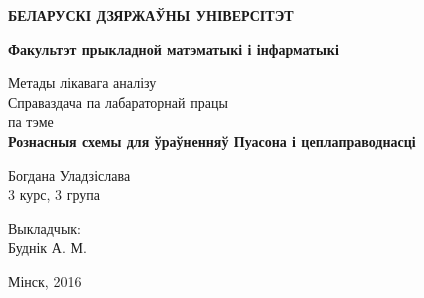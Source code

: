 \begin{titlepage}
    \begin{center}
        {\bf БЕЛАРУСКІ ДЗЯРЖАЎНЫ УНІВЕРСІТЭТ}
    \end{center}
    \begin{center}
        {\bf Факультэт прыкладной матэматыкі і інфарматыкі}
    \end{center}

    \vspace{15em}

    \begin{center}
        {\LARGE Метады лікавага аналізу} \\
        \vspace{5mm}
        {\LARGE Справаздача па лабараторнай працы} \\
        {\large па тэме} \\
        \vspace{5mm}
        {\bf \LARGE Рознасныя схемы для ўраўненняў Пуасона і цеплаправоднасці}
    \end{center}

    \vspace{12em}

    \begin{flushright}
        \LARGE{
        Богдана Уладзіслава\\
        3 курс, 3 група\\}
    \end{flushright}

    \vspace{5em}

    \begin{flushright}
        \LARGE{
        Выкладчык:\\
        Буднік А. М.\\}
    \end{flushright}

    \vfill

    \begin{center}
        {\LARGE Мінск, 2016}
    \end{center}
\end{titlepage}
\newpage

